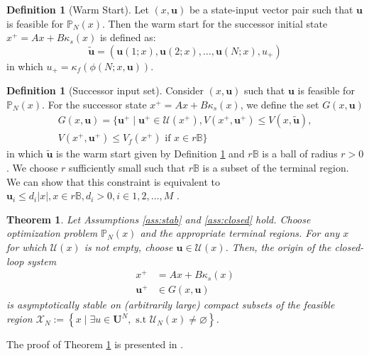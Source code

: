 \documentclass[10pt]{article}
\newcommand{\bu}{\mathbf{u}}
\newcommand{\norm}[1]{\vert #1 \vert}
\newcommand{\set}[1]{\left\lbrace #1 \right\rbrace}
\newtheorem{theorem}[assumption]{Theorem}
\theoremstyle{definition}
\newtheorem{definition}[assumption]{Definition}
\begin{document}
\begin{definition}[Warm Start]
\label{def:warmstart}
Let $(x,\bu)$ be a state-input vector pair such that $\bu$ is feasible
for $\mathbb{P}_N(x)$.  Then the warm start for the successor initial state
$x^+ = Ax+B\kappa_s(x)$ is defined as:
\begin{equation*}
\tilde{\bu} = \left (\bu(1;x),\bu(2;x),\ldots,\bu(N;x),u_+\right)
\end{equation*}
in which  $u_+ = \kappa_f(\phi(N;x,\bu))$.
\end{definition}
\begin{definition}[Successor input set]
\label{def:G}
Consider $(x,\bu)$ such that $\bu$ is feasible for
$\mathbb{P}_N(x)$. For the  successor state 
$x^+ = Ax+B\kappa_s(x)$, we define the set $G(x,\bu)$
\begin{multline*}
G(x,\bu) = \lbrace \bu^+ \mid \bu^+ \in
\mathcal{U}(x^+), V(x^+,\bu^+)\leq V(x,\tilde{\bu}), \\
V(x^+,\bu^+) \leq V_f(x^+) \text{~if~} x\in r\mathbb{B} \rbrace
\end{multline*}
in which $\tilde{\bu}$ is the warm start given by Definition 
\ref{def:warmstart} and $r\mathbb{B}$ is a ball of radius $r>0$. We
choose $r$ sufficiently small such that  
$r\mathbb{B}$ is a subset of the terminal region. We can show that
this constraint is equivalent to  $\bu_i \leq d_i \norm{x}, x \in
r\mathbb{B},d_i >0, i \in 1,2,\ldots,M$ \citep{subramanian:rawlings:maravelias:2012}.  
\end{definition}

\begin{theorem}
\label{thm:suboptimal}
Let Assumptions \ref{ass:stab} and \ref{ass:closed}
hold. Choose optimization problem $\mathbb{P}_N(x)$ and the appropriate terminal
regions. For any $x$ for which  $\mathcal{U}(x)$  is not empty, choose
$\bu \in \mathcal{U}(x)$. Then, the origin of the closed-loop system 
\begin{align*}
x^+ &= Ax+ B\kappa_s(x) \\
\bu^+ &\in G(x,\bu)
\end{align*}
is asymptotically stable on (arbitrarily large) compact  subsets of
the feasible region $\mathcal{X}_N :=\set{x\mid \exists u \in
  \mathbf{U}^N, \text{~s.t~} \mathcal{U}_N(x) \neq \varnothing}$. 
\end{theorem}

The proof of Theorem \ref{thm:suboptimal} is presented in
\citep{pannocchia:rawlings:wright:2011}.
\end{document}
